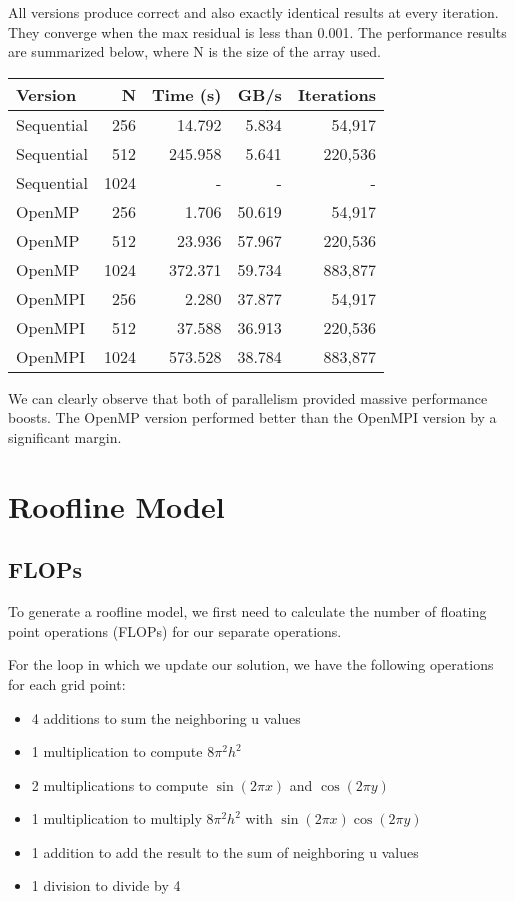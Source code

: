 \documentclass[11pt]{article}
\begin{document}
All versions produce correct and also exactly identical results at every iteration. They converge when the max residual is less than 0.001. The performance results are summarized below, where N is the size of the array used.

\begin{table}[H]
    \centering
    \begin{tabular}{lrrrr}
        \toprule
        Version & N & Time (s) & GB/s & Iterations \\
        \midrule
        Sequential & 256 & 14.792 & 5.834 & 54,917 \\
        Sequential & 512 & 245.958 & 5.641 & 220,536 \\
        Sequential & 1024 & - & - & - \\
        OpenMP & 256 & 1.706 & 50.619 & 54,917 \\
        OpenMP & 512 & 23.936 & 57.967 & 220,536 \\
        OpenMP & 1024 & 372.371 & 59.734 & 883,877 \\
        OpenMPI & 256 & 2.280 & 37.877 & 54,917 \\
        OpenMPI & 512 & 37.588 & 36.913 & 220,536 \\
        OpenMPI & 1024 & 573.528 & 38.784 & 883,877 \\
        \bottomrule
    \end{tabular}
\end{table}

We can clearly observe that both of parallelism provided massive performance boosts. The OpenMP version performed better than the OpenMPI version by a significant margin. 

\section*{Roofline Model}

\subsection*{FLOPs}

To generate a roofline model, we first need to calculate the number of floating point operations (FLOPs) for our separate operations.

For the loop in which we update our solution, we have the following operations for each grid point:
\begin{itemize}
    \item 4 additions to sum the neighboring u values
    \item 1 multiplication to compute $8\pi^2 h^2$
    \item 2 multiplications to compute $\sin(2\pi x)$ and $\cos(2\pi y)$
    \item 1 multiplication to multiply $8\pi^2 h^2$ with $\sin(2\pi x) \cos(2\pi y)$
    \item 1 addition to add the result to the sum of neighboring u values
    \item 1 division to divide by 4
\end{itemize}
\end{document}
